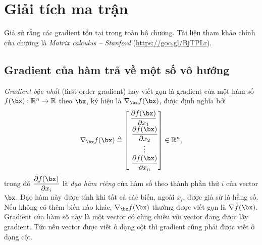 
\chapter{Giải tích ma trận}

\def\largevspace{\renewcommand{\arraystretch}{2}}
\def\smallvspace{\renewcommand{\arraystretch}{1}}

\vspace{-1.2in}
Giả sử rằng các gradient tồn tại trong toàn bộ chương. Tài liệu tham khảo
chính của chương là \textit{Matrix calculus -- Stanford}
(\url{https://goo.gl/BjTPLr}).

\largevspace
\section{Gradient của hàm trả về một số vô hướng}
\textit{Gradient bậc nhất} ({first-order gradient}) hay viết gọn là
{gradient} của một hàm số $f(\bx): \mathbb{R}^n
\rightarrow
\mathbb{R}$
theo $\bx$, ký hiệu là $\nabla_{\bx} f(\bx)$, được định nghĩa bởi
\begin{equation}
    \label{eqn:grvector1}
    \nabla_{\bx} f(\bx) \triangleq
    \left[
    \begin{matrix}
    \dfrac{\partial f(\bx)}{\partial x_1} \\\
    \dfrac{\partial f(\bx)}{\partial x_2} \\\
    \vdots \\\
    \dfrac{\partial f(\bx)}{\partial x_n}
    \end{matrix}
    \right] \in \mathbb{R}^n,
\end{equation}
trong đó $\displaystyle\dfrac{\partial f(\bx)}{\partial x_i}$ là \textit{đạo hàm
riêng} của hàm số theo thành phần thứ $i$ của
vector $\bx$. Đạo hàm này được tính khi tất cả các biến, ngoài $x_i$, được giả sử
là hằng số. Nếu không có thêm biến nào khác, $\nabla_{\bx}f(\bx)$ thường được
viết gọn là $\nabla f(\bx)$. {Gradient của hàm số này là một vector có
cùng chiều với vector đang được lấy gradient}. Tức nếu vector được viết ở dạng
cột thì gradient cũng phải được viết ở dạng cột.%

